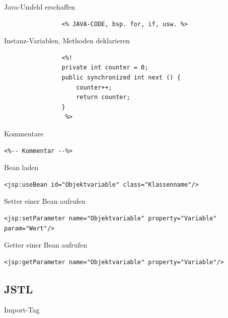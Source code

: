 \documentclass[11pt]{article}
\begin{document}
			Java-Umfeld erschaffen	
			
			\begin{lstlisting}
				<% JAVA-CODE, bsp. for, if, usw. %>
			\end{lstlisting}
			
			Instanz-Variablen, Methoden deklarieren
			
			\begin{lstlisting}
				<%! 
				private int counter = 0;
				public synchronized int next () {			
					counter++;
					return counter; 
				}
				 %>
			\end{lstlisting}
			
			Kommentare
			
			\begin{lstlisting}
<%-- Kommentar --%>
			\end{lstlisting}
			
			Bean laden
			
			\begin{lstlisting}
<jsp:useBean id="Objektvariable" class="Klassenname"/>
			\end{lstlisting}			
			
			Setter einer Bean aufrufen
			
			\begin{lstlisting}
<jsp:setParameter name="Objektvariable" property="Variable" param="Wert"/>			
			\end{lstlisting}
			
			Getter einer Bean aufrufen
			
			\begin{lstlisting}
<jsp:getParameter name="Objektvariable" property="Variable"/>
			\end{lstlisting}
			
			
		\subsection{JSTL}	
			
			Import-Tag
			
\end{document}
